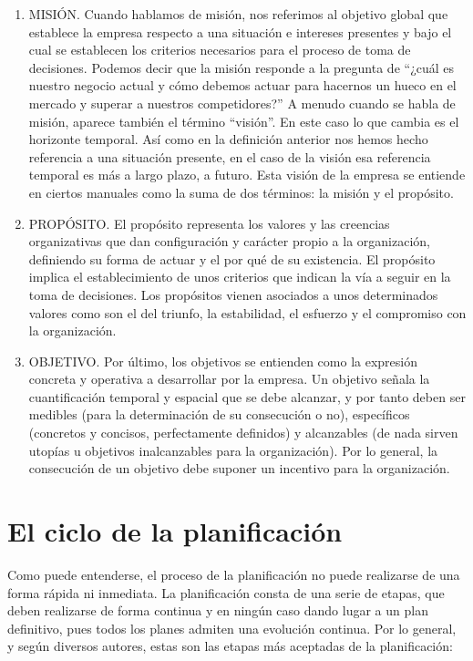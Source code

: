 \documentclass[
]{krantz}
\providecommand{\tightlist}{%
  \setlength{\itemsep}{0pt}\setlength{\parskip}{0pt}}
\begin{document}
\begin{enumerate}
\def\labelenumi{\arabic{enumi}.}
\tightlist
\item
  MISIÓN. Cuando hablamos de misión, nos referimos al objetivo global que establece la empresa respecto a una situación e intereses presentes y bajo el cual se establecen los criterios necesarios para el proceso de toma de decisiones. Podemos decir que la misión responde a la pregunta de ``¿cuál es nuestro negocio actual y cómo debemos actuar para hacernos un hueco en el mercado y superar a nuestros competidores?''
  A menudo cuando se habla de misión, aparece también el término ``visión''. En este caso lo que cambia es el horizonte temporal. Así como en la definición anterior nos hemos hecho referencia a una situación presente, en el caso de la visión esa referencia temporal es más a largo plazo, a futuro. Esta visión de la empresa se entiende en ciertos manuales como la suma de dos términos: la misión y el propósito.
\item
  PROPÓSITO. El propósito representa los valores y las creencias organizativas que dan configuración y carácter propio a la organización, definiendo su forma de actuar y el por qué de su existencia. El propósito implica el establecimiento de unos criterios que indican la vía a seguir en la toma de decisiones. Los propósitos vienen asociados a unos determinados valores como son el del triunfo, la estabilidad, el esfuerzo y el compromiso con la organización.
\item
  OBJETIVO. Por último, los objetivos se entienden como la expresión concreta y operativa a desarrollar por la empresa. Un objetivo señala la cuantificación temporal y espacial que se debe alcanzar, y por tanto deben ser medibles (para la determinación de su consecución o no), específicos (concretos y concisos, perfectamente definidos) y alcanzables (de nada sirven utopías u objetivos inalcanzables para la organización). Por lo general, la consecución de un objetivo debe suponer un incentivo para la organización.
\end{enumerate}

\hypertarget{el-ciclo-de-la-planificaciuxf3n}{%
\section{El ciclo de la planificación}\label{el-ciclo-de-la-planificaciuxf3n}}

Como puede entenderse, el proceso de la planificación no puede realizarse de una forma rápida ni inmediata. La planificación consta de una serie de etapas, que deben realizarse de forma continua y en ningún caso dando lugar a un plan definitivo, pues todos los planes admiten una evolución continua. Por lo general, y según diversos autores, estas son las etapas más aceptadas de la planificación:
\end{document}
